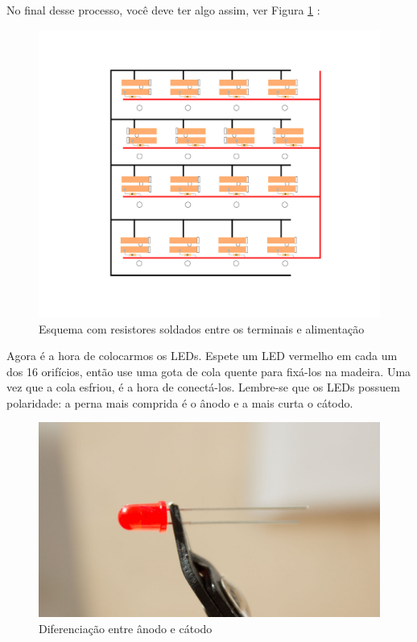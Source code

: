 \documentclass[paper=a4, fontsize=11pt]{scrartcl} %
\numberwithin{equation}{section} %
\numberwithin{figure}{section} %
\numberwithin{table}{section} %
\begin{document}
No final desse processo, você deve ter algo assim, ver Figura \ref {fig:esquema com resistores} :

\begin{figure}[h!] %
   \centering
   \includegraphics[scale=0.15]{./imagens/board-6.jpg}
   \caption[ ]{Esquema com resistores soldados entre os terminais e alimentação }
   \label{fig:esquema com resistores}
\end{figure}
   
Agora é a hora de colocarmos os LEDs. Espete um LED vermelho em cada um dos 16 orifícios, então use uma gota de cola quente para fixá-los na madeira. Uma vez que a cola esfriou, é a hora de conectá-los. Lembre-se que os LEDs possuem polaridade: a perna mais comprida é o ânodo e a mais curta o cátodo. 

\begin{figure}[h!] %
  \centering
  \includegraphics[scale=0.10]{./imagens/diy-docs-6.jpg}
  \caption[ ]{Diferenciação entre ânodo e cátodo }
  \label{fig:termnais led}
\end{figure}
\end{document}
